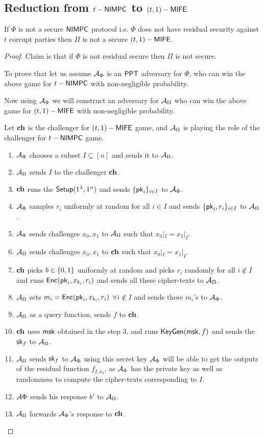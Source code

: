 \subsection{Reduction from $t-\mathsf{NIMPC}$ to $(t,1)-\mathsf{MIFE}$}
\begin{theorem}
If $\Phi$ is not a secure $\mathsf{NIMPC}$ protocol i.e. $\Phi$ does not have residual security against $t$ corrupt parties then $\Pi$ is not a secure $(t,1)-\mathsf{MIFE}$.
\end{theorem}

\begin{proof}
Claim is that if $\Phi$ is not residual secure then $\Pi$ is not secure.

To prove that let us assume $\mathcal{A}_{\Phi}$ is an $\mathsf{PPT}$ adversary for $\Phi$, who can win the above game for $t-\mathsf{NIMPC}$ with non-negligible probability. 

Now using $\mathcal{A}_{\Phi}$ we will construct an adversary for $\mathcal{A}_{\Pi}$ who can win the above game for $(t,1)-
\mathsf{MIFE}$ with non-negligible probability.

Let $\mathbf{ch}$ is the challenger for $(t,1)-\mathsf{MIFE}$ game, and $\mathcal{A}_{\Pi}$ is playing the role of the challenger for $t-\mathsf{NIMPC}$ game. 

\begin{enumerate}
\item $\mathcal{A}_{\Phi}$ chooses a subset $I\subseteq [n]$ and sends it to $\mathcal{A}_{\Pi}$.
\item $\mathcal{A}_{\Pi}$ sends $I$ to the challenger $\mathbf{ch}$.
\item $\mathbf{ch}$ runs the $\mathsf{Setup}(1^{\lambda}, 1^n)$ and sends $\{\mathsf{pk}_i\}_{i\in I}$ to $\mathcal{A}_{\Phi}$.
\item $\mathcal{A}_{\Phi}$ samples $r_i$ uniformly at random for all $i \in I$ and sends $\{\mathsf{pk}_i ,r_i\}_{i\in I}$ to $\mathcal{A}_{\Pi}$.
\item $\mathcal{A}_{\Phi}$ sends challenges $x_0, x_1$ to $\mathcal{A}_{\Pi}$ such that $x_0|_I=x_1|_I$.
\item $\mathcal{A}_{\Pi}$ sends challenges $x_0, x_1$ to $\mathbf{ch}$ such that $x_0|_I=x_1|_I$.
\item $\mathbf{ch}$ picks $b\in \{0,1\}$ uniformly at random and picks $r_i$ randomly for all $i \notin I$ and runs $\mathsf{Enc}(\mathsf{pk}_i, x_{b_i}, r_i)$ and sends all these cipher-texts to $\mathcal{A}_{\Pi}$.
\item $\mathcal{A}_{\Pi}$ sets $m_i=\mathsf{Enc}(\mathsf{pk}_i, x_{b_i}, r_i)$ $\forall i\notin I$ and sends these $m_i$'s to $\mathcal{A}_{\Phi}$.
\item $\mathcal{A}_{\Pi}$ as a query function, sends $f$ to $\mathbf{ch}$.
\item $\mathbf{ch}$ uses $\mathsf{msk}$ obtained in the step 3, and runs $\mathsf{KeyGen}(\mathsf{msk} , f)$ and sends the $\mathsf{sk}_f$ to $\mathcal{A}_{\Pi}$.
\item $\mathcal{A}_{\Pi}$ sends $\mathsf{sk}_f$ to $\mathcal{A}_{\Phi}$ using this secret key $\mathcal{A}_{\Phi}$ will be able to get the outputs of the residual function $f_{I,x_b}$, as $\mathcal{A}_{\Phi}$ has the private key as well as randomness to compute the cipher-texts corresponding to $I$.
\item $\mathcal{A}{\Phi}$ sends his response $b'$ to $\mathcal{A}_{\Pi}$.
\item $\mathcal{A}_{\Pi}$ forwards $\mathcal{A}_{\Phi}$'s response to $\mathbf{ch}$. 
\end{enumerate}


\end{proof}

